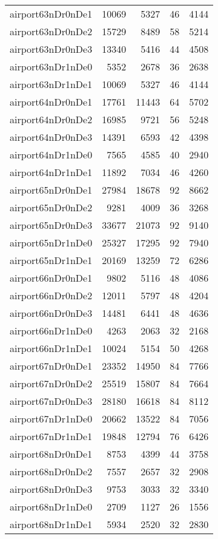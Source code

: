 \begin{longtable}{lrrrr}
airport63nDr0nDe1 & 10069 & 5327 & 46 & 4144 \\
airport63nDr0nDe2 & 15729 & 8489 & 58 & 5214 \\
airport63nDr0nDe3 & 13340 & 5416 & 44 & 4508 \\
airport63nDr1nDe0 & 5352 & 2678 & 36 & 2638 \\
airport63nDr1nDe1 & 10069 & 5327 & 46 & 4144 \\
airport64nDr0nDe1 & 17761 & 11443 & 64 & 5702 \\
airport64nDr0nDe2 & 16985 & 9721 & 56 & 5248 \\
airport64nDr0nDe3 & 14391 & 6593 & 42 & 4398 \\
airport64nDr1nDe0 & 7565 & 4585 & 40 & 2940 \\
airport64nDr1nDe1 & 11892 & 7034 & 46 & 4260 \\
airport65nDr0nDe1 & 27984 & 18678 & 92 & 8662 \\
airport65nDr0nDe2 & 9281 & 4009 & 36 & 3268 \\
airport65nDr0nDe3 & 33677 & 21073 & 92 & 9140 \\
airport65nDr1nDe0 & 25327 & 17295 & 92 & 7940 \\
airport65nDr1nDe1 & 20169 & 13259 & 72 & 6286 \\
airport66nDr0nDe1 & 9802 & 5116 & 48 & 4086 \\
airport66nDr0nDe2 & 12011 & 5797 & 48 & 4204 \\
airport66nDr0nDe3 & 14481 & 6441 & 48 & 4636 \\
airport66nDr1nDe0 & 4263 & 2063 & 32 & 2168 \\
airport66nDr1nDe1 & 10024 & 5154 & 50 & 4268 \\
airport67nDr0nDe1 & 23352 & 14950 & 84 & 7766 \\
airport67nDr0nDe2 & 25519 & 15807 & 84 & 7664 \\
airport67nDr0nDe3 & 28180 & 16618 & 84 & 8112 \\
airport67nDr1nDe0 & 20662 & 13522 & 84 & 7056 \\
airport67nDr1nDe1 & 19848 & 12794 & 76 & 6426 \\
airport68nDr0nDe1 & 8753 & 4399 & 44 & 3758 \\
airport68nDr0nDe2 & 7557 & 2657 & 32 & 2908 \\
airport68nDr0nDe3 & 9753 & 3033 & 32 & 3340 \\
airport68nDr1nDe0 & 2709 & 1127 & 26 & 1556 \\
airport68nDr1nDe1 & 5934 & 2520 & 32 & 2830 \\

\end{longtable}
